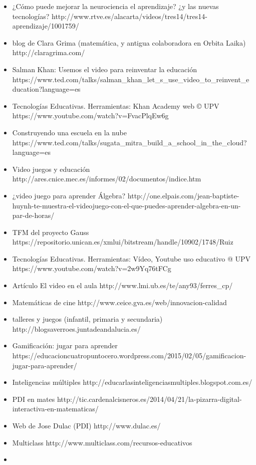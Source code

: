 \begin{itemize}
	\item 
	¿Cómo puede mejorar la neurociencia el aprendizaje? ¿y las nuevas tecnologías? 
	http://www.rtve.es/alacarta/videos/tres14/tres14-aprendizaje/1001759/
	\item 
	blog de Clara Grima (matemática, y antigua colaboradora en Orbita Laika)
	http://claragrima.com/
	\item 
	Salman Khan: Usemos el video para reinventar la educación
	https://www.ted.com/talks/salman_khan_let_s_use_video_to_reinvent_education?language=es
	\item 
	Tecnologías Educativas. Herramientas: Khan Academy web © UPV
	https://www.youtube.com/watch?v=FvacPlqEw6g
	\item 
	Construyendo una escuela en la nube
	https://www.ted.com/talks/sugata_mitra_build_a_school_in_the_cloud?language=es
	\item 
	Video juegos y educación
	http://ares.cnice.mec.es/informes/02/documentos/indice.htm
	\item 
	¿video juego para aprender Álgebra?
	http://one.elpais.com/jean-baptiste-huynh-te-muestra-el-videojuego-con-el-que-puedes-aprender-algebra-en-un-par-de-horas/
	\item
	TFM del proyecto Gauss
	https://repositorio.unican.es/xmlui/bitstream/handle/10902/1748/Ruiz%
	\item 
	Tecnologías Educativas. Herramientas: Vídeo, Youtube uso educativo @ UPV
	https://www.youtube.com/watch?v=2w9Yq76tFCg
	\item 
	Artículo El video en el aula
	http://www.lmi.ub.es/te/any93/ferres_cp/
	\item 
	Matemáticas de cine
	http://www.ceice.gva.es/web/innovacion-calidad
	\item
	talleres y juegos (infantil, primaria y secundaria)
	http://blogsaverroes.juntadeandalucia.es/
	\item 
	Gamificación: jugar para aprender
	https://educacioncuatropuntocero.wordpress.com/2015/02/05/gamificacion-jugar-para-aprender/
	\item 
	Inteligencias múltiples
	http://educarlasinteligenciasmultiples.blogspot.com.es/
	\item 
	PDI en mates
	http://tic.cardenalcisneros.es/2014/04/21/la-pizarra-digital-interactiva-en-matematicas/
	\item
	Web de Jose Dulac (PDI)
	http://www.dulac.es/
	\item 
	Multiclass
	http://www.multiclass.com/recursos-educativos
	\item 

\end{itemize}
